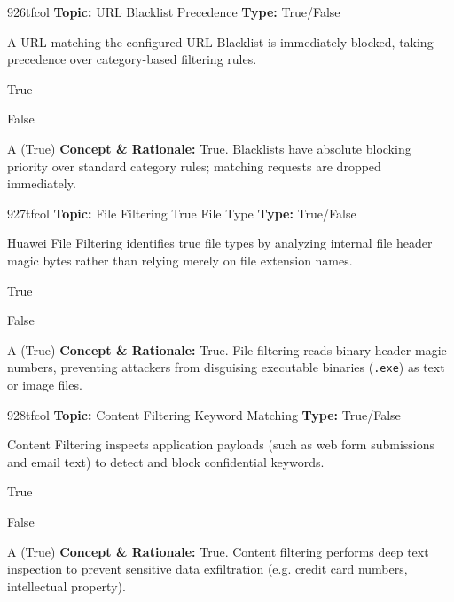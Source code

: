 \begin{qcard}{926}{tfcol}
\textcolor{darkslate!75}{\small\textbf{Topic:} URL Blacklist Precedence \hfill \textbf{Type:} True/False}\vspace{0.4em}\par
A URL matching the configured URL Blacklist is immediately blocked, taking precedence over category-based filtering rules.
\begin{qoptions}
\item True
\item False
\end{qoptions}
\end{qcard}
\nopagebreak
\begin{explainbox}{A (True)}
\textbf{Concept \& Rationale:} True. Blacklists have absolute blocking priority over standard category rules; matching requests are dropped immediately.
\end{explainbox}

\begin{qcard}{927}{tfcol}
\textcolor{darkslate!75}{\small\textbf{Topic:} File Filtering True File Type \hfill \textbf{Type:} True/False}\vspace{0.4em}\par
Huawei File Filtering identifies true file types by analyzing internal file header magic bytes rather than relying merely on file extension names.
\begin{qoptions}
\item True
\item False
\end{qoptions}
\end{qcard}
\nopagebreak
\begin{explainbox}{A (True)}
\textbf{Concept \& Rationale:} True. File filtering reads binary header magic numbers, preventing attackers from disguising executable binaries (\texttt{.exe}) as text or image files.
\end{explainbox}

\begin{qcard}{928}{tfcol}
\textcolor{darkslate!75}{\small\textbf{Topic:} Content Filtering Keyword Matching \hfill \textbf{Type:} True/False}\vspace{0.4em}\par
Content Filtering inspects application payloads (such as web form submissions and email text) to detect and block confidential keywords.
\begin{qoptions}
\item True
\item False
\end{qoptions}
\end{qcard}
\nopagebreak
\begin{explainbox}{A (True)}
\textbf{Concept \& Rationale:} True. Content filtering performs deep text inspection to prevent sensitive data exfiltration (e.g. credit card numbers, intellectual property).
\end{explainbox}

